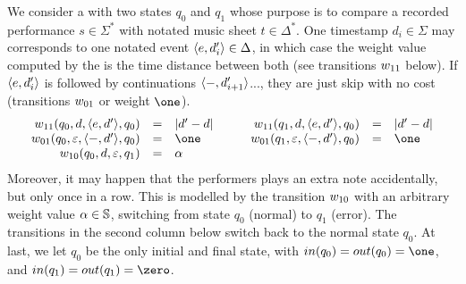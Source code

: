 \begin{example}
We consider a \SWT with two states $q_0$ and $q_1$ whose purpose 
is to compare a recorded performance $s \in \Sigma^*$
with notated music sheet $t \in \Delta^*$.
One timestamp $d_i \in \Sigma$ may corresponds 
to one notated event $\<\mathsf{e}, d'_i> \in \Delta$, in which case 
the weight value computed by the \SWT is the time distance between both
(see transitions $\wei_{11}$ below).
%
If $\<\mathsf{e}, d'_i>$ is followed by continuations 
$\<\mathsf{-}, d'_{i+1}>$..., they are just skip with no cost (transitions $\wei_{01}$ or weight $\one$).
\[
\begin{array}{rclcrcl}
\wei_{11}(q_0, d, \< \mathsf{e}, d'>, q_0) & = & |d' - d| & \quad &
\wei_{11}(q_1, d, \< \mathsf{e}, d'>, q_0) & = & |d' - d|\\
\wei_{01}(q_0, \varepsilon, \< \mathsf{-}, d'>, q_0) & = & \one & &
\wei_{01}(q_1, \varepsilon, \< \mathsf{-}, d'>, q_0) & = & \one\\
\wei_{10}(q_0, d, \varepsilon, q_1) & = & \alpha & & %
\end{array}
\]
%
Moreover, it may happen that the performers plays an extra note accidentally, but only once in a row. 
This is modelled by the transition $\wei_{10}$ with an arbitrary weight value $\alpha \in \mathbb{S}$, 
switching from state $q_0$ (normal) to $q_1$ (error).
The transitions in the second column below switch back to the normal state $q_0$.
At last, we let $q_0$ be the only initial and final state, with
$\init(q_0) = \final(q_0) = \one$, and 
$\init(q_1) = \final(q_1) = \zero$. 
\endex
\end{example}

